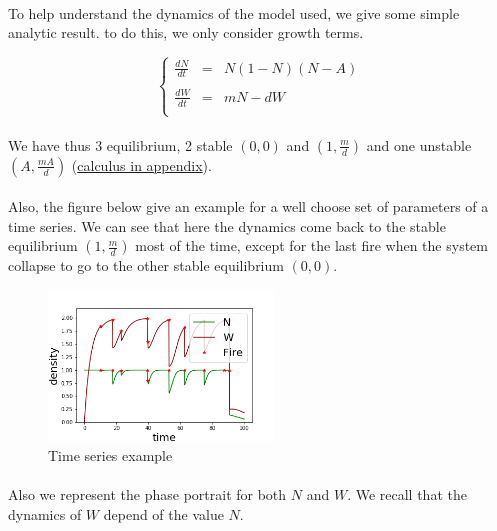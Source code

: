 \documentclass{article}
\begin{document}
\paragraph{} %
To help understand the dynamics of the model used, we give some simple analytic result. to do this, we only consider growth terms.

\[ %
\left\lbrace
\begin{array}{rcl}
\frac{dN}{dt} & = & N(1-N)(N-A) \\
\\
\frac{dW}{dt} & = & mN -dW \\
\end{array}
\right.
\]

\paragraph{}
We have thus 3 equilibrium, 2 stable $(0, 0)$ and $(1, \frac{m}{d})$ and one unstable $(A, \frac{mA}{d})$ (\hyperref[equi]{calculus in appendix}).

\paragraph{}
Also, the figure below give an example for a well choose set of parameters of a time series. We can see that here the dynamics come back to the stable equilibrium $(1, \frac{m}{d})$ most of the time, except for the last fire when the system collapse to go to the other stable equilibrium $(0, 0)$. 

\begin{figure}[h!]
\centering
\includegraphics[width=6cm]{return_between_2.png}
\caption{Time series example}
\end{figure}

\newpage
\paragraph{}
Also we represent the phase portrait for both $N$ and $W$. We recall that the dynamics of $W$ depend of the value $N$. 
\end{document}
